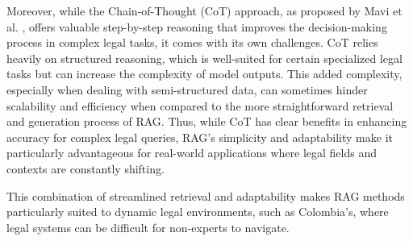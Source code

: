 Moreover, while the Chain-of-Thought (CoT) approach, as proposed by Mavi et al. 
\cite{mavi2023retrievalaugmentedchainofthoughtsemistructureddomains}, offers valuable 
step-by-step reasoning that improves the decision-making process in complex legal tasks, 
it comes with its own challenges. CoT relies heavily on structured reasoning, 
which is well-suited for certain specialized legal tasks but can increase the complexity 
of model outputs. This added complexity, especially when dealing with semi-structured data, 
can sometimes hinder scalability and efficiency when compared to the more straightforward 
retrieval and generation process of RAG. Thus, while CoT has clear benefits in 
enhancing accuracy for complex legal queries, RAG’s simplicity and adaptability 
make it particularly advantageous for real-world applications where legal fields 
and contexts are constantly shifting.

This combination of streamlined retrieval and adaptability makes RAG methods particularly 
suited to dynamic legal environments, such as Colombia's, where legal systems can be 
difficult for non-experts to navigate.
\endinput

